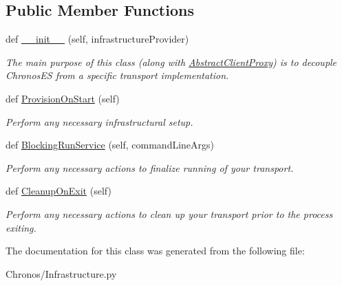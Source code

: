 \subsection*{Public Member Functions}
\begin{DoxyCompactItemize}
\item 
def \hyperlink{group__Chronos_gaa89c796fdfbdffe469b52cf4e829bb9b}{\+\_\+\+\_\+init\+\_\+\+\_\+} (self, infrastructure\+Provider)
\begin{DoxyCompactList}\small\item\em The main purpose of this class (along with \hyperlink{classChronos_1_1Infrastructure_1_1AbstractClientProxy}{Abstract\+Client\+Proxy}) is to decouple Chronos\+ES from a specific transport implementation. \end{DoxyCompactList}\item 
def \hyperlink{group__Chronos_ga18de01cae1c0b89622784731e69bc800}{Provision\+On\+Start} (self)
\begin{DoxyCompactList}\small\item\em Perform any necessary infrastructural setup. \end{DoxyCompactList}\item 
def \hyperlink{group__Chronos_ga17d1f940e05a0994be7dcdf3584317e6}{Blocking\+Run\+Service} (self, command\+Line\+Args)
\begin{DoxyCompactList}\small\item\em Perform any necessary actions to finalize running of your transport. \end{DoxyCompactList}\item 
def \hyperlink{group__Chronos_ga3853376d38bda7eaed7d2d703c72a7da}{Cleanup\+On\+Exit} (self)
\begin{DoxyCompactList}\small\item\em Perform any necessary actions to clean up your transport prior to the process exiting. \end{DoxyCompactList}\end{DoxyCompactItemize}


The documentation for this class was generated from the following file\+:\begin{DoxyCompactItemize}
\item 
Chronos/Infrastructure.\+py\end{DoxyCompactItemize}
